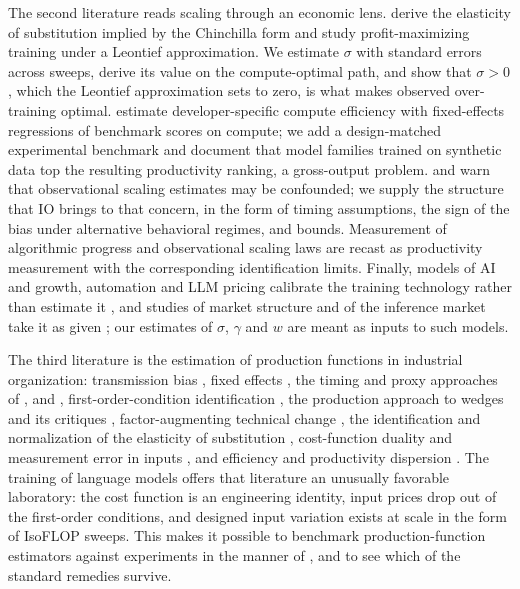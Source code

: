 The second literature reads scaling through an economic lens. \citet{hao2026theory} derive the elasticity of
substitution implied by the Chinchilla form and study profit-maximizing training under a Leontief approximation. We
estimate $\sigma$ with standard errors across sweeps, derive its value on the compute-optimal path, and show that
$\sigma > 0$, which the Leontief approximation sets to zero, is what makes observed over-training optimal.
\citet{mertens2026secret} estimate developer-specific compute efficiency with fixed-effects regressions of benchmark
scores on compute; we add a design-matched experimental benchmark and document that model families trained on synthetic data top
the resulting productivity ranking, a gross-output problem. \citet{whitfill2025note} and
\citet{konig2026validity} warn that observational scaling estimates may be confounded; we supply the structure that
IO brings to that concern, in the form of timing assumptions, the sign of the bias under alternative behavioral
regimes, and bounds. Measurement of algorithmic progress \citep{erdil2022algorithmic, ho2024algorithmic,
gundlach2025origin} and observational scaling laws \citep{ruan2024observational, maiapolo2024sloth} are recast as
productivity measurement with the corresponding identification limits. Finally, models of AI and growth, automation
and LLM pricing calibrate the training technology rather than estimate it \citep{trammell2023economic,
erdil2025gate, bergemann2025economics}, and studies of market structure and of the inference market take it as
given \citep{korinek2025concentrating, demirer2025emerging}; our estimates of $\sigma$, $\gamma$ and $w$ are meant
as inputs to such models.

The third literature is the estimation of production functions in industrial organization: transmission bias
\citep{marschak1944random}, fixed effects \citep{mundlak1961empirical}, the timing and proxy approaches of
\citet{olley1996dynamics}, \citet{levinsohn2003estimating} and \citet{ackerberg2015identification}, first-order-condition
identification \citep{gandhi2020identification}, the production approach to wedges \citep{deloecker2012markups}
and its critiques \citep{bond2020unpleasant, raval2023testing}, factor-augmenting technical change
\citep{doraszelski2018measuring, demirer2020production}, the identification and normalization of the elasticity of
substitution \citep{diamond1978measurement, klump2007factor, leonledesma2010identifying}, cost-function duality and
measurement error in inputs \citep{nerlove1963returns, collardwexler2016production}, and efficiency and productivity
dispersion \citep{farrell1957measurement, foster2008reallocation, hsieh2009misallocation, syverson2011determines}.
The training of language models offers that literature an unusually favorable laboratory: the cost function is an
engineering identity, input prices drop out of the first-order conditions, and designed input variation exists at
scale in the form of IsoFLOP sweeps. This makes it possible to benchmark production-function estimators against
experiments in the manner of \citet{lalonde1986evaluating}, and to see which of the standard remedies survive.

